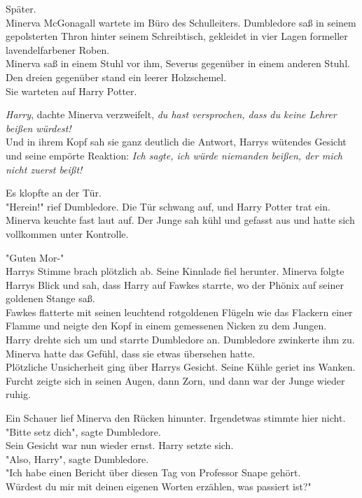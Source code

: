 {Später.\\ Minerva McGonagall wartete im Büro des Schulleiters. Dumbledore saß in seinem gepolsterten Thron hinter seinem Schreibtisch, gekleidet in vier Lagen formeller lavendelfarbener Roben.\\ Minerva saß in einem Stuhl vor ihm, Severus gegenüber in einem anderen Stuhl. Den dreien gegenüber stand ein leerer Holzschemel.\\ Sie warteten auf Harry Potter.

\emph{Harry}, dachte Minerva verzweifelt, \emph{du hast versprochen, dass du keine Lehrer beißen würdest!}\\ Und in ihrem Kopf sah sie ganz deutlich die Antwort, Harrys wütendes Gesicht und seine empörte Reaktion: \emph{Ich sagte, ich würde niemanden beißen, der mich nicht zuerst beißt!}

Es klopfte an der Tür.\\ "Herein!" rief Dumbledore. Die Tür schwang auf, und Harry Potter trat ein.\\ Minerva keuchte fast laut auf. Der Junge sah kühl und gefasst aus und hatte sich vollkommen unter Kontrolle.

"Guten Mor-"\\ Harrys Stimme brach plötzlich ab. Seine Kinnlade fiel herunter. Minerva folgte Harrys Blick und sah, dass Harry auf Fawkes starrte, wo der Phönix auf seiner goldenen Stange saß.\\ Fawkes flatterte mit seinen leuchtend rotgoldenen Flügeln wie das Flackern einer Flamme und neigte den Kopf in einem gemessenen Nicken zu dem Jungen.\\ Harry drehte sich um und starrte Dumbledore an. Dumbledore zwinkerte ihm zu. Minerva hatte das Gefühl, dass sie etwas übersehen hatte.\\ Plötzliche Unsicherheit ging über Harrys Gesicht. Seine Kühle geriet ins Wanken. Furcht zeigte sich in seinen Augen, dann Zorn, und dann war der Junge wieder ruhig.

Ein Schauer lief Minerva den Rücken hinunter. Irgendetwas stimmte hier nicht.\\ "Bitte setz dich", sagte Dumbledore.\\ Sein Gesicht war nun wieder ernst. Harry setzte sich.\\ "Also, Harry", sagte Dumbledore.\\ "Ich habe einen Bericht über diesen Tag von Professor Snape gehört.\\ Würdest du mir mit deinen eigenen Worten erzählen, was passiert ist?"

}
